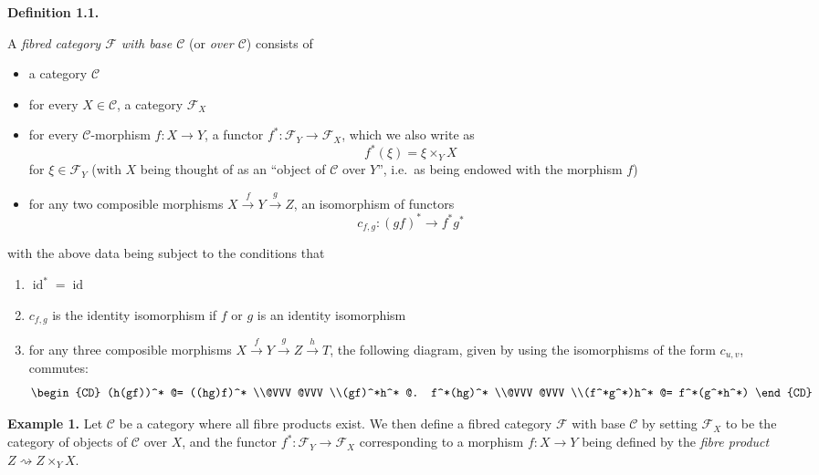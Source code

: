 \documentclass{article}
\newenvironment{rmenv}[1]
  {\phantomsection\par\smallskip\noindent\textbf{#1.}\rmfamily}
  {\par\smallskip}
\theoremstyle{definition}
\theoremstyle{definition}
\theoremstyle{definition}
\theoremstyle{definition}
\theoremstyle{remark}
\begin{document}
\hypertarget{fga-3-i-section-A.1-definition-1.1}{}
\begin{rmenv}{Definition 1.1}

A \emph{fibred category \({\mathcal{F}}\) with base \({\mathcal{C}}\)} (or \emph{over \({\mathcal{C}}\)}) consists of

\begin{itemize}
\item
  a category \({\mathcal{C}}\)
\item
  for every \(X\in{\mathcal{C}}\), a category \({\mathcal{F}}_X\)
\item
  for every \({\mathcal{C}}\)-morphism \(f\colon X\to Y\), a functor \(f^*\colon{\mathcal{F}}_Y\to{\mathcal{F}}_X\), which we also write as
  \[
    f^*(\xi) = \xi \times_Y X
  \]
  for \(\xi\in{\mathcal{F}}_Y\) (with \(X\) being thought of as an ``object of \({\mathcal{C}}\) over \(Y\)'', i.e.~as being endowed with the morphism \(f\))
\item
  for any two composible morphisms \(X\xrightarrow{f}Y\xrightarrow{g}Z\), an isomorphism of functors
  \[
    c_{f,g}\colon (gf)^* \to f^*g^*
  \]
\end{itemize}

with the above data being subject to the conditions that

\begin{enumerate}
\def\labelenumi{\roman{enumi}.}
\item
  \(\operatorname{id}^*=\operatorname{id}\)
\item
  \(c_{f,g}\) is the identity isomorphism if \(f\) or \(g\) is an identity isomorphism
\item
  for any three composible morphisms \(X\xrightarrow{f}Y\xrightarrow{g}Z\xrightarrow{h}T\), the following diagram, given by using the isomorphisms of the form \(c_{u,v}\), commutes:
  \[
      \begin{CD}
   (h(gf))^* @= ((hg)f)^*
      \\@VVV @VVV
      \\(gf)^*h^* @. f^*(hg)^*
      \\@VVV @VVV
      \\(f^*g^*)h^* @= f^*(g^*h^*)
      \end{CD}
    \]
\end{enumerate}

\end{rmenv}

\leavevmode{}%
\begin{rmenv}{Example 1}
Let \({\mathcal{C}}\) be a category where all fibre products exist.
We then define a fibred category \({\mathcal{F}}\) with base \({\mathcal{C}}\) by setting \({\mathcal{F}}_X\) to be the category of objects of \({\mathcal{C}}\) over \(X\), and the functor \(f^*\colon{\mathcal{F}}_Y\to{\mathcal{F}}_X\) corresponding to a morphism \(f\colon X\to Y\) being defined by the \emph{fibre product} \(Z\rightsquigarrow Z\times_Y X\).

\end{rmenv}
\end{document}
